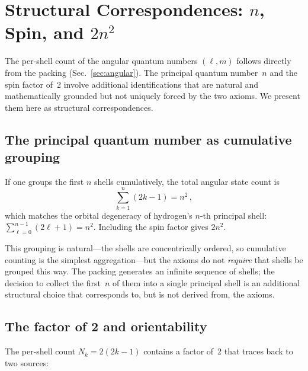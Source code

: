 \documentclass[aps,prl,reprint,amsmath,amssymb]{revtex4-2}
\begin{document}
\section{Structural Correspondences: $n$, Spin, and $2n^2$}
\label{sec:correspondences}

The per-shell count of the angular quantum numbers $(\ell, m)$ follows
directly from the packing (Sec.~\ref{sec:angular}).  The principal quantum number~$n$
and the spin factor of~2 involve additional identifications that are
natural and mathematically grounded but not uniquely forced by the two
axioms.  We present them here as structural correspondences.

\subsection{The principal quantum number as cumulative grouping}

If one groups the first $n$ shells cumulatively, the total angular
state count is
\begin{equation}
  \sum_{k=1}^{n} (2k - 1) = n^2 \,,
  \label{eq:n-squared}
\end{equation}
which matches the orbital degeneracy of hydrogen's $n$-th principal
shell: $\sum_{\ell=0}^{n-1}(2\ell+1) = n^2$.  Including the spin
factor gives $2n^2$.

This grouping is natural---the shells are concentrically ordered, so
cumulative counting is the simplest aggregation---but the axioms do
not \emph{require} that shells be grouped this way.  The packing
generates an infinite sequence of shells; the decision to collect the
first~$n$ of them into a single principal shell is an additional
structural choice that corresponds to, but is not derived from, the
axioms.

\subsection{The factor of 2 and orientability}

The per-shell count $N_k = 2(2k-1)$ contains a factor of~2 that
traces back to two sources:
\end{document}
